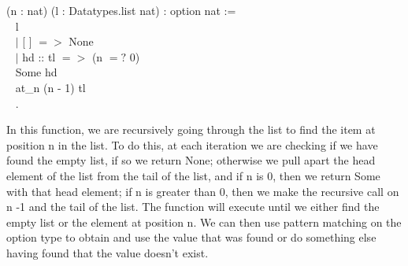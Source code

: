\begin{code}
	\Fixpoint {} (n : nat) (l : Datatypes.list nat) : option nat :=	\\ \-\ \quad
	  \match l \with 										\\ \-\ \qquad
	  $\mid$ [ ] $=>$ None								\\ \-\ \qquad
	  $\mid$ hd :: tl $=>$  \If (n $=?$ 0)			\\ \-\ \qquad\qquad\qquad\quad
		    \Then Some hd					\\ \-\ \qquad\qquad\qquad\quad
		    \Else at\_n (n - 1) tl							\\ \-\ \qquad
	  \End.
\end{code}

\noindent
In this function, we are recursively going through the list to find the item at position n in the list.
To do this, at each iteration we are checking if we have found the empty list, if so we return None; 
otherwise we pull apart the head element of the list from the tail of the list, and if n is 0, then we return Some with that head element; 
if n is greater than 0, then we make the recursive call on n -1 and the tail of the list. 
The function will execute until we either find the empty list or the element at position n.
We can then use pattern matching on the option type to obtain and use the value that was found or do something else having found that the value doesn't exist.








